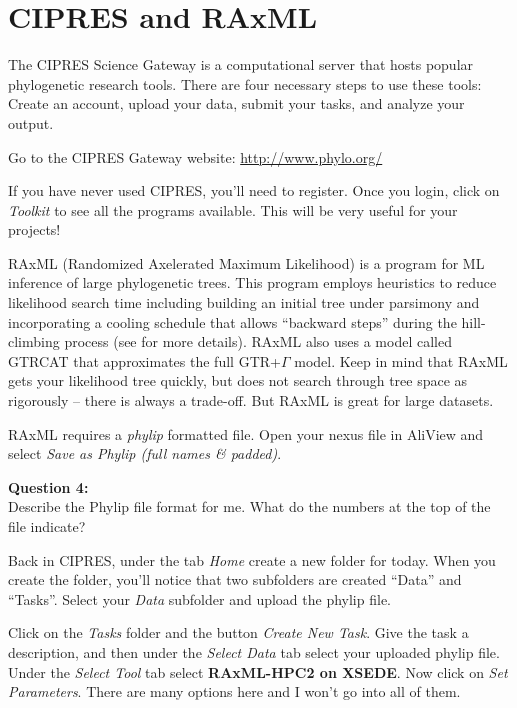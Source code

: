 \documentclass[11pt]{article}
\begin{document}
\section{CIPRES and RAxML}

The CIPRES Science Gateway is a computational server that hosts popular phylogenetic research tools.  There are four necessary steps to use these tools:  Create an account, upload your data, submit your tasks, and analyze your output. 

Go to the CIPRES Gateway website: \url{http://www.phylo.org/}

If you have never used CIPRES, you'll need to register.
Once you login, click on \textit{Toolkit} to see all the programs available.
This will be very useful for your projects!

RAxML (Randomized Axelerated Maximum Likelihood) is a program for ML inference of large phylogenetic trees.  
This program employs heuristics to reduce likelihood search time including building an initial tree 
under parsimony and incorporating a cooling schedule that allows ``backward steps'' 
during the hill-climbing process (see \citet{stamatakis2005raxml} for more details).  
RAxML also uses a model called GTRCAT that approximates the full GTR+$\Gamma$ model.
Keep in mind that RAxML gets your likelihood tree quickly, 
but does not search through tree space as rigorously -- there is always a trade-off.
But RAxML is great for large datasets.

RAxML requires a \textit{phylip} formatted file. Open your nexus file
in AliView and select \textit{Save as Phylip (full names \& padded)}.

\begin{framed}
\noindent
\textbf{Question 4:} \\
Describe the Phylip file format for me.  What do the numbers at the top of the file indicate?
\end{framed}


Back in CIPRES, under the tab \textit{Home} create a new folder for today.  
When you create the folder, you’ll notice that two subfolders are created ``Data'' and ``Tasks''.
Select your \textit{Data} subfolder and upload the phylip file.

Click on the \textit{Tasks} folder and the button \textit{Create New Task}.
Give the task a description, and then
under the \textit{Select Data} tab select your uploaded phylip file.
Under the \textit{Select Tool} tab select \textbf{RAxML-HPC2 on XSEDE}.
Now click on \textit{Set Parameters}. There are many options here and I won't go into all of them.  
\end{document}

